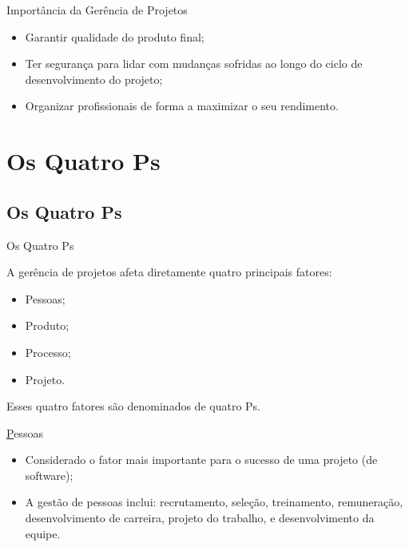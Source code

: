 \documentclass[xcolor=x11names,compress]{beamer}
\begin{document}
\begin{frame}{Importância da Gerência de Projetos}

\begin{itemize}
\itemsep 5mm

\item Garantir qualidade do produto final;

\item Ter segurança para lidar com mudanças sofridas ao longo do ciclo de desenvolvimento do projeto;

\item Organizar profissionais de forma a maximizar o seu rendimento.

\end{itemize}

\end{frame}

\section{Os Quatro Ps}
\subsection{Os Quatro Ps}
\begin{frame}{Os Quatro Ps}

A gerência de projetos afeta diretamente quatro principais fatores:

\begin{itemize}
\itemsep 5mm

\item Pessoas;

\item Produto;

\item Processo;

\item Projeto.
\end{itemize}

\begin{block}{}
\centering Esses quatro fatores são denominados de quatro Ps.
\end{block}
\end{frame}

\begin{frame}{\underline{P}essoas}

\begin{itemize}
\itemsep 5mm

\item Considerado o fator mais importante para o sucesso de uma projeto (de software);

\item A gestão de pessoas inclui: recrutamento, seleção, treinamento, remuneração, desenvolvimento de carreira, projeto do trabalho, e desenvolvimento da equipe.

\end{itemize}

\end{frame}
\end{document}
